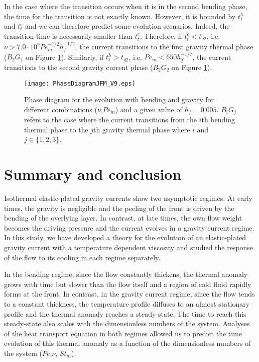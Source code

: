 In  the case  where the  transition occurs  when it  is in  the second
bending  phase, the  time for  the  transition is  not exactly  known.
However, it  is bounded by  $t_t^h$ and  $t_t^c$ and we  can therefore
predict  some evolution  scenarios.   Indeed, the  transition time  is
necessarily smaller than $t_t^c$.   Therefore, if $t_t^c<t_{g2}$, i.e.
$\nu>7.0\cdot 10^9Pe_m^{-7/2} h_f^{-1/2}$,  the current transitions to
the    first   gravity    thermal    phase    ($B_2G_1$   on    Figure
\ref{C3-Phase_Diagram_ELASGRAV}).  Similarly,  if $t_t^h>t_{g2}$, i.e.
$Pe_m<650h_f^{-1/7}$, the  current transitions  to the  second gravity
current phase ($B_2G_2$ on Figure \ref{C3-Phase_Diagram_ELASGRAV}).
\begin{figure}[h!]
  \begin{center}
    \graphicspath{ {/Users/thorey/Documents/These/Projet/Refroidissement/Skin_Model/Figure/JFM_V13/} }
    \texttt{[image: PhaseDiagramJFM\_V9.eps]}
    \caption{Phase diagram for the  evolution with bending and gravity
      for different  combinations ($\nu$,$Pe_m$) and a  given value of
      $h_f =  0.005$.  $B_iG_j$ refers  to the case where  the current
      transitions from  the $i$th bending  thermal phase to  the $j$th
      gravity thermal phase where $i$ and $j \in \{1,2,3\}$.}
    \label{C3-Phase_Diagram_ELASGRAV}
  \end{center}
\end{figure}
\section{Summary and conclusion}
\label{C3-sec:conclusion}

Isothermal  elastic-plated   gravity  currents  show   two  asymptotic
regimes.  At early times, the gravity is negligible and the peeling of
the  front is  driven  by  the bending  of  the  overlying layer.   In
contrast,  at late  times, the  own  flow weight  becomes the  driving
pressure and the current evolves in a gravity current regime.  In this
study,  we   have  developed  a   theory  for  the  evolution   of  an
elastic-plated gravity current with  a temperature dependent viscosity
and studied  the response of  the flow to  its cooling in  each regime
separately.

In the bending regime, since the flow constantly thickens, the thermal
anomaly grows with  time but slower than the flow  itself and a region
of cold fluid rapidly forms at  the front. In contrast, in the gravity
current  regime, since  the flow  tends to  a constant  thickness, the
temperature profile diffuses  to an almost stationary  profile and the
thermal  anomaly  reaches a  steady-state.   The  time to  reach  this
steady-state also scales with the dimensionless numbers of the system.
Analyses of the heat transport equation  in both regimes allowed us to
predict the  time evolution of this  thermal anomaly as a  function of
the dimensionless numbers of the system ($Pe$,$\nu$, $St_m$).

